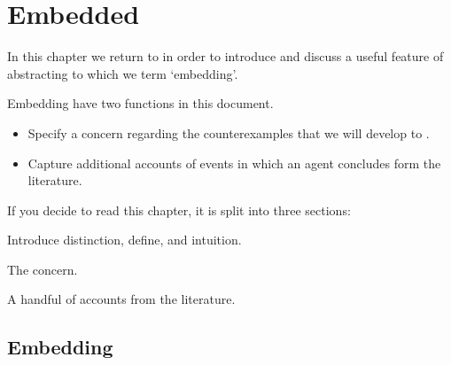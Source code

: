 \chapter{Embedded }
\label{cha:embed}

\begin{note}
  In this chapter we return to  in order to introduce and discuss a useful feature of abstracting to  which we term `embedding'.

  Embedding have two functions in this document.
  \begin{itemize}
  \item
    Specify a concern regarding the counterexamples that we will develop to \issueConstraint{}.
  \item
    Capture additional accounts of events in which an agent concludes form the literature.
  \end{itemize}
\end{note}

\begin{note}
  If you decide to read this chapter, it is split into three sections:

  \begin{TOCEnum}
  \item

    Introduce distinction, define, and intuition.
  \item

    The concern.
  \item

    A handful of accounts from the literature.
  \end{TOCEnum}
\end{note}

\section{Embedding }
\label{cha:var:ros:Emb}

